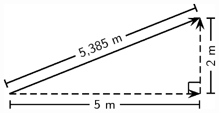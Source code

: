 {\begin{mdframed}[linewidth=4, leftmargin=40, rightmargin=40]
\begin{exercise}
\begin{enumerate}[noitemsep, label=\textbf{Step} \textbf{\arabic*}. ]
        
        \label{m38819*id194847}
          
    \setcounter{subfigure}{0}


	\begin{figure}[H] %
    \begin{center}
    \label{m38819*id194850!!!underscore!!!media}\label{m38819*id194850!!!underscore!!!printimage}\includegraphics{col11305.imgs/m38819_PG11C1_066.png} %
        
      \vspace{2pt}
    \vspace{.1in}
    
    \end{center}

 \end{figure}   

    \addtocounter{footnote}{-0}
    

\end{enumerate}
\end{exercise}
\end{mdframed}}
